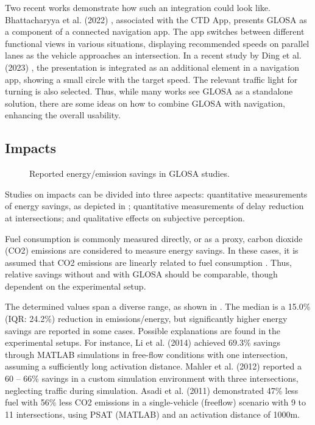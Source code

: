 Two recent works demonstrate how such an integration could look like. Bhattacharyya et al. (2022) \cite{bhattacharyya_assessing_2022}, associated with the CTD App, presents GLOSA as a component of a connected navigation app. The app switches between different functional views in various situations, displaying recommended speeds on parallel lanes as the vehicle approaches an intersection. In a recent study by Ding et al. (2023) \cite{ding_speedadv_2023}, the presentation is integrated as an additional element in a navigation app, showing a small circle with the target speed. The relevant traffic light for turning is also selected. Thus, while many works see GLOSA as a standalone solution, there are some ideas on how to combine GLOSA with navigation, enhancing the overall usability.

\subsection{Impacts}

\begin{figure}
\centering
\resizebox{\linewidth}{!}{%

}
\caption{Reported energy/emission savings in GLOSA studies.}
\label{fig:related-work-energy-savings}
\end{figure}

Studies on impacts can be divided into three aspects: quantitative measurements of energy savings, as depicted in ; quantitative measurements of delay reduction at intersections; and qualitative effects on subjective perception.

Fuel consumption is commonly measured directly, or as a proxy, carbon dioxide (CO2) emissions are considered to measure energy savings. In these cases, it is assumed that CO2 emissions are linearly related to fuel consumption \cite{seredynski_comparison_2013, seredynski_multi-segment_2013}. Thus, relative savings without and with GLOSA should be comparable, though dependent on the experimental setup.

The determined values span a diverse range, as shown in . The median is a 15.0\% (IQR: 24.2\%) reduction in emissions/energy, but significantly higher energy savings are reported in some cases. Possible explanations are found in the experimental setups. For instance, Li et al. (2014) \cite{li_multi-vehicles_2014} achieved 69.3\% savings through MATLAB simulations in free-flow conditions with one intersection, assuming a sufficiently long activation distance. Mahler et al. (2012) \cite{mahler_reducing_2012} reported a 60 -- 66\% savings in a custom simulation environment with three intersections, neglecting traffic during simulation. Asadi et al. (2011) \cite{asadi_predictive_2011} demonstrated 47\% less fuel with 56\% less CO2 emissions in a single-vehicle (freeflow) scenario with 9 to 11 intersections, using PSAT (MATLAB) and an activation distance of 1000m.

